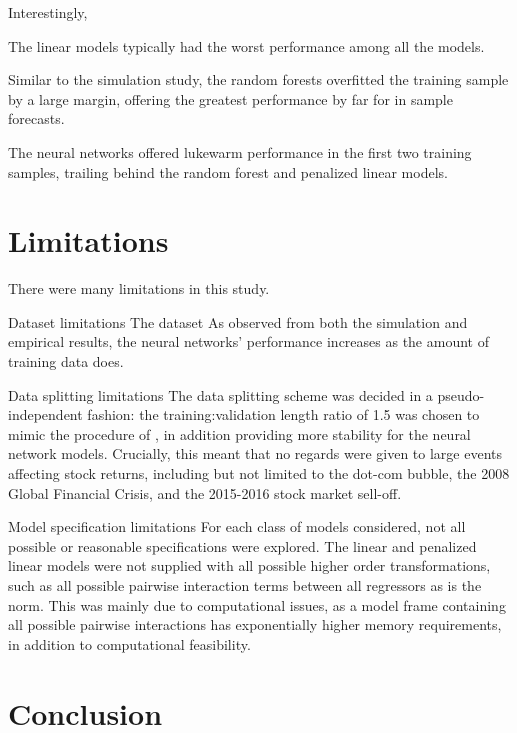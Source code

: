 \documentclass[a4paper, table]{article}
\begin{document}
Interestingly, 


The linear models typically had the worst performance among all the models.





Similar to the simulation study, the random forests overfitted the training sample by a large margin, offering the greatest performance by far for in sample forecasts.


The neural networks offered lukewarm performance in the first two training samples, trailing behind the random forest and penalized linear models. 

\section{Limitations}

There were many limitations in this study.

Dataset limitations
The dataset 
As observed from both the simulation and empirical results, the neural networks' performance increases as the amount of training data does. 

Data splitting limitations
The data splitting scheme was decided in a pseudo-independent fashion: the training:validation length ratio of 1.5 was chosen to mimic the procedure of \cite{gu_empirical_2018}, in addition providing more stability for the neural network models. Crucially, this meant that no regards were given to large events affecting stock returns, including but not limited to the dot-com bubble, the 2008 Global Financial Crisis, and the 2015-2016 stock market sell-off. 

Model specification limitations
For each class of models considered, not all possible or reasonable specifications were explored. The linear and penalized linear models were not supplied with all possible higher order transformations, such as all possible pairwise interaction terms between all regressors as is the norm. This was mainly due to computational issues, as a model frame containing all possible pairwise interactions has exponentially higher memory requirements, in addition to computational feasibility. 

\section{Conclusion}
\end{document}
